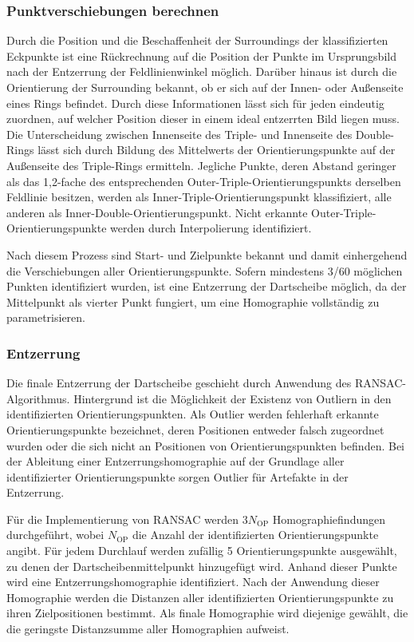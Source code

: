 \subsubsection{Punktverschiebungen berechnen}
\label{sec:punktverschiebungen}

Durch die Position und die Beschaffenheit der Surroundings der klassifizierten Eckpunkte ist eine Rückrechnung auf die Position der Punkte im Ursprungsbild nach der Entzerrung der Feldlinienwinkel möglich. Darüber hinaus ist durch die Orientierung der Surrounding bekannt, ob er sich auf der Innen- oder Außenseite eines Rings befindet. Durch diese Informationen lässt sich für jeden eindeutig zuordnen, auf welcher Position dieser in einem ideal entzerrten Bild liegen muss. Die Unterscheidung zwischen Innenseite des Triple- und Innenseite des Double-Rings lässt sich durch Bildung des Mittelwerts der Orientierungspunkte auf der Außenseite des Triple-Rings ermitteln. Jegliche Punkte, deren Abstand geringer als das 1,2-fache des entsprechenden Outer-Triple-Orientierungspunkts derselben Feldlinie besitzen, werden als Inner-Triple-Orientierungspunkt klassifiziert, alle anderen als Inner-Double-Orientierungspunkt. Nicht erkannte Outer-Triple-Orientierungspunkte werden durch Interpolierung identifiziert.

Nach diesem Prozess sind Start- und Zielpunkte bekannt und damit einhergehend die Verschiebungen aller Orientierungspunkte. Sofern mindestens 3/60 möglichen Punkten identifiziert wurden, ist eine Entzerrung der Dartscheibe möglich, da der Mittelpunkt als vierter Punkt fungiert, um eine Homographie vollständig zu parametrisieren.

\subsubsection{Entzerrung}
\label{sec:entzerrung}

Die finale Entzerrung der Dartscheibe geschieht durch Anwendung des RANSAC-Algorithmus. Hintergrund ist die Möglichkeit der Existenz von Outliern in den identifizierten Orientierungspunkten. Als Outlier werden fehlerhaft erkannte Orientierungspunkte bezeichnet, deren Positionen entweder falsch zugeordnet wurden oder die sich nicht an Positionen von Orientierungspunkten befinden. Bei der Ableitung einer Entzerrungshomographie auf der Grundlage aller identifizierter Orientierungspunkte sorgen Outlier für Artefakte in der Entzerrung.

Für die Implementierung von RANSAC werden $3 N_\text{OP}$ Homographiefindungen durchgeführt, wobei $N_\text{OP}$ die Anzahl der identifizierten Orientierungspunkte angibt. Für jedem Durchlauf werden zufällig 5 Orientierungspunkte ausgewählt, zu denen der Dartscheibenmittelpunkt hinzugefügt wird. Anhand dieser Punkte wird eine Entzerrungshomographie identifiziert. Nach der Anwendung dieser Homographie werden die Distanzen aller identifizierten Orientierungspunkte zu ihren Zielpositionen bestimmt. Als finale Homographie wird diejenige gewählt, die die geringste Distanzsumme aller Homographien aufweist.

